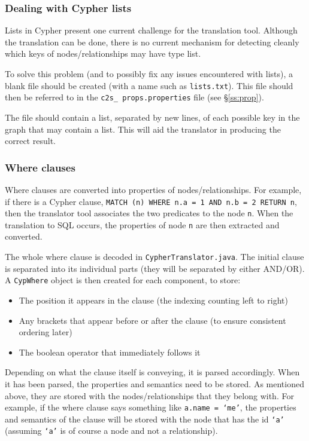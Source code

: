 \documentclass[letterpaper]{ltxdoc}
\begin{document}
\subsubsection{Dealing with Cypher lists}
\label{sssec:lists}
Lists in Cypher present one current challenge for the translation tool. Although the translation can be done, there is no current mechanism for detecting cleanly which keys of nodes/relationships may have type list.

To solve this problem (and to possibly fix any issues encountered with lists), a blank file should be created (with a name such as \texttt{lists.txt}). This file should then be referred to in the \texttt{c2s\_ props.properties} file (see \S \ref{ss:prop}).

The file should contain a list, separated by new lines, of each possible key in the graph that may contain a list. This will aid the translator in producing the correct result.


\subsubsection{Where clauses}
Where clauses are converted into properties of nodes/relationships. For example, if there is a Cypher clause, \texttt{MATCH (n) WHERE n.a = 1 AND n.b = 2 RETURN n}, then the translator tool associates the two predicates to the node \texttt{n}. When the translation to SQL occurs, the properties of node \texttt{n} are then extracted and converted.

The whole where clause is decoded in \texttt{CypherTranslator.java}. The initial clause is separated into its individual parts (they will be separated by either AND/OR). A \texttt{CypWhere} object is then created for each component, to store:

\begin{itemize}
\item The position it appears in the clause (the indexing counting left to right)
\item Any brackets that appear before or after the clause (to ensure consistent ordering later)
\item The boolean operator that immediately follows it
\end{itemize}

Depending on what the clause itself is conveying, it is parsed accordingly. When it has been parsed, the properties and semantics need to be stored. As mentioned above, they are stored with the nodes/relationships that they belong with. For example, if the where clause says something like \texttt{a.name = `me'}, the properties and semantics of the clause will be stored with the node that has the id \texttt{`a'} (assuming \texttt{`a'} is of course a node and not a relationship).
\end{document}
